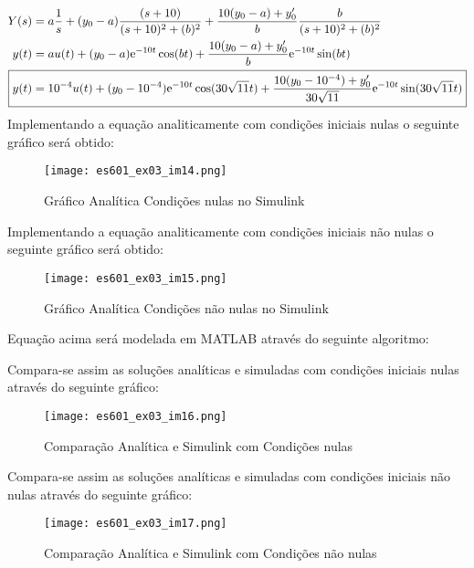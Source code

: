 \documentclass{article}
\begin{document}
\begin{resolution}
\begin{align}
                        Y(s) &= 
                                a\frac{1}{s} + 
                                (y_{0} - a)\frac{(s+10)}{(s+10)^2 + (b)^2} + 
                                \frac{10(y_{0} - a) + y'_{0}}{b}\frac{b}{(s+10)^2 + (b)^2}\nonumber\\
                        y(t) &= au(t) + (y_{0} - a)\text{e}^{-10t}\cos(bt) + \frac{10(y_{0} - a) + y'_{0}}{b}\text{e}^{-10t}\sin(bt)\nonumber\\
                        \Aboxed{y(t) &= 10^{-4}u(t) + (y_{0} - 10^{-4})\text{e}^{-10t}\cos(30\sqrt{11}t) + \frac{10(y_{0} - 10^{-4}) + y'_{0}}{30\sqrt{11}}\text{e}^{-10t}\sin(30\sqrt{11}t)}
                    \end{align}
\newpage
                Implementando a equação analiticamente com condições iniciais nulas o seguinte gráfico será obtido:
                    \begin{figure}[H]
                        \centering
                        \texttt{[image: es601\_ex03\_im14.png]}
                        \caption{Gráfico Analítica Condições nulas no Simulink}
                    \end{figure}
                Implementando a equação analiticamente com condições iniciais não nulas o seguinte gráfico será obtido:
                    \begin{figure}[H]
                        \centering
                        \texttt{[image: es601\_ex03\_im15.png]}
                        \caption{Gráfico Analítica Condições não nulas no Simulink}
                    \end{figure}
\newpage
                Equação acima será modelada em MATLAB através do seguinte algoritmo:
                    \begin{scriptsize}
                        \myOctave
                        
                    \end{scriptsize}
\newpage
                Compara-se assim as soluções analíticas e simuladas com condições iniciais nulas através do seguinte gráfico:
                    \begin{figure}[H]
                        \centering
                        \texttt{[image: es601\_ex03\_im16.png]}
                        \caption{Comparação Analítica e Simulink com Condições nulas}
                    \end{figure}
                Compara-se assim as soluções analíticas e simuladas com condições iniciais não nulas através do seguinte gráfico:
                    \begin{figure}[H]
                        \centering
                        \texttt{[image: es601\_ex03\_im17.png]}
                        \caption{Comparação Analítica e Simulink com Condições não nulas}
                    \end{figure}
            \end{resolution}
\end{document}
